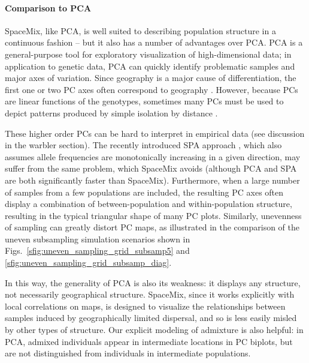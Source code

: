 \documentclass[10pt,letterpaper]{article}
\begin{document}
\paragraph{Comparison to PCA}
SpaceMix, like PCA, is well suited to describing population structure in a continuous fashion --
but it also has a number of advantages over PCA. 
PCA is a general-purpose tool for exploratory visualization of high-dimensional data;
in application to genetic data, PCA can quickly identify problematic samples and major axes of variation.  
Since geography is a major cause of differentiation, the first one or two PC axes often correspond to geography \cite{novembre_interpreting_2008}.  
However, 
because PCs are linear functions of the genotypes,
sometimes many PCs must be used to depict patterns produced by simple isolation by distance \cite{novembre_interpreting_2008}. 

These higher order PCs can be hard to interpret in empirical data (see discussion in the warbler section).
The recently introduced SPA approach \cite{yang_model-based_2012},
which also assumes allele frequencies are monotonically increasing in a given direction,
may suffer from the same problem, which SpaceMix avoids
(although PCA and SPA are both significantly faster than SpaceMix).  
Furthermore, when a large number of samples from a few populations are included, 
the resulting PC axes often display a combination of between-population and within-population structure, 
resulting in the typical triangular shape of many PC plots.
Similarly, unevenness of sampling can greatly distort PC maps, 
as illustrated in the comparison of the uneven subsampling simulation scenarios 
shown in Figs.\ \ref{sfig:uneven_sampling_grid_subsamp5} and \ref{sfig:uneven_sampling_grid_subsamp_diag}.

In this way, the generality of PCA is also its weakness: 
it displays any structure, not necessarily geographical structure. 
SpaceMix, since it works explicitly with local correlations on maps, 
is designed to visualize the relationships between samples induced by geographically limited dispersal,
and so is less easily misled by other types of structure.
Our explicit modeling of admixture is also helpful: in PCA, admixed individuals appear in intermediate locations in PC biplots, 
but are not distinguished from individuals in intermediate populations.
\end{document}
